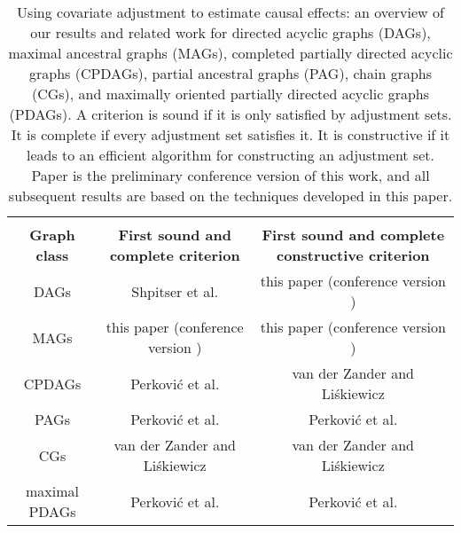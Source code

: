 \newcommand{\etall}{ et al. }
\begin{table}
\centering\begin{tabular}{ccc}
&\multicolumn{2}{c}{\bf }\\
\bf Graph class & \bf First sound and complete criterion & \bf First sound and complete constructive criterion \\
DAGs
     & Shpitser\etall \cite{ShpitserVR2010} & this paper (conference version \cite{zander2014constructing}) \\
MAGs
     & this paper (conference version \cite{zander2014constructing}) & this paper (conference version \cite{zander2014constructing})\\
CPDAGs
     &Perkovi\'{c}\etall \cite{PerkovicEtAl2018} &van der Zander and Li\'{s}kiewicz \cite{vanderZander2016separators}\\
PAGs 
     &Perkovi\'{c}\etall \cite{PerkovicEtAl2018} &Perkovi\'{c}\etall \cite{PerkovicEtAl2018}\\
CGs
   &van der Zander and Li\'{s}kiewicz \cite{vanderZander2016separators}&van der Zander and Li\'{s}kiewicz \cite{vanderZander2016separators}\\
maximal PDAGs 
  & Perkovi\'{c}\etall \cite{PerkovicEtAl2017}
  & Perkovi\'{c}\etall \cite{PerkovicEtAl2017} \\
\end{tabular}
\caption{
Using covariate adjustment to estimate causal effects:
an overview of our results and related work 
for directed acyclic graphs (DAGs), 
maximal ancestral graphs (MAGs),
completed partially directed acyclic graphs (CPDAGs), 
partial ancestral graphs (PAG),  
chain graphs (CGs), and maximally oriented partially directed acyclic graphs (PDAGs).
	A criterion is sound if it is only satisfied by adjustment sets. It is complete if every adjustment set satisfies it.  It is constructive if it leads to an efficient algorithm for constructing an adjustment set.  Paper \cite{zander2014constructing} is the preliminary conference version of this work, and all subsequent results are based on the techniques developed in this paper.}\label{table:related}
\end{table}


